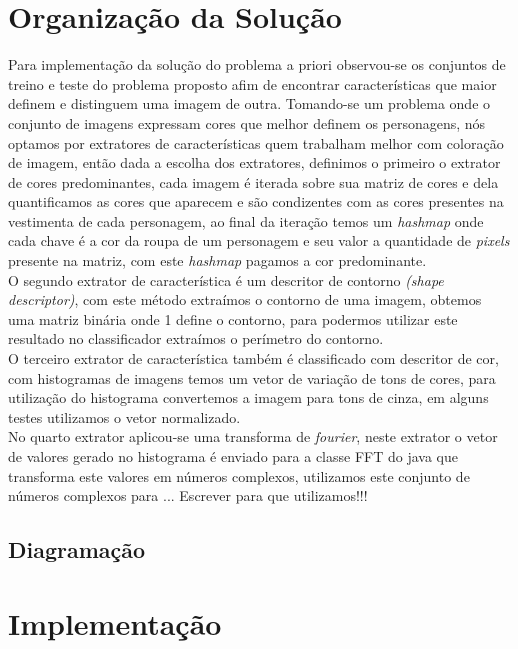 \documentclass[12pt]{article}
\begin{document}
\section{Organização da Solução}\label{sec:solucao}

	Para implementação da solução do problema a priori observou-se os conjuntos de treino e teste do problema proposto afim de encontrar características que maior definem e distinguem uma imagem de outra. Tomando-se um problema onde o conjunto de imagens expressam cores que melhor definem os personagens, nós optamos por extratores de características quem trabalham melhor com coloração de imagem, então dada a escolha dos extratores, definimos o primeiro o extrator de cores predominantes, cada imagem é iterada sobre sua matriz de cores e dela quantificamos as cores que aparecem e são condizentes com as cores presentes na vestimenta de cada personagem, ao final da iteração temos um \textit{hashmap} onde cada chave é a cor da roupa de um personagem e seu valor a quantidade de \textit{pixels} presente na matriz, com este \textit{hashmap} pagamos a cor predominante.\\
	O segundo extrator de característica é um descritor de contorno \textit{(shape descriptor)}, com este método extraímos o contorno de uma imagem, obtemos uma matriz binária onde 1 define o contorno, para podermos utilizar este resultado no classificador extraímos o perímetro do contorno. \\
	O terceiro extrator de característica também é classificado com descritor de cor, com histogramas de imagens temos um vetor de variação de tons de cores, para utilização do histograma convertemos a imagem para tons de cinza, em alguns testes utilizamos o vetor normalizado.\\
	No quarto extrator aplicou-se uma transforma de \textit{fourier}, neste extrator o vetor de valores gerado no histograma é enviado para a classe FFT do java que transforma este valores em números complexos, utilizamos este conjunto de números complexos para ... Escrever para que utilizamos!!!


\subsection{Diagramação}\label{sec:diagramacao}
	
	




\section{Implementação}
\end{document}
